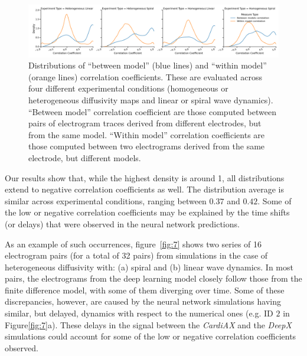 \documentclass[utf8]{frontiersSCNS} %
\begin{document}
\begin{figure}[!htp]
\centering
\includegraphics[width=\textwidth]{Figure-6.png}
\caption{ 
Distributions of ``between model'' (blue lines) and ``within model'' (orange lines) correlation coefficients. These are evaluated across four different experimental conditions (homogeneous or heterogeneous diffusivity maps and linear or spiral wave dynamics). ``Between model'' correlation coefficient are those computed between pairs of electrogram traces derived from different electrodes, but from the same model. ``Within model'' correlation coefficients are those computed between two electrograms derived from the same electrode, but different models.
}
\label{fig:6}
\end{figure}

Our results show that, while the highest density is around 1, all distributions extend to negative correlation coefficients as well. The distribution average is similar across experimental conditions, ranging between $0.37$ and $0.42$. 
Some of the low or negative correlation coefficients may be explained by the time shifts (or delays) that were observed in the neural network predictions. 

As an example of such occurrences, figure~\ref{fig:7} shows two series of 16 electrogram pairs (for a total of 32 pairs) from simulations in the case of heterogeneous diffusivity with: (a) spiral and (b) linear wave dynamics.
In most pairs, the electrograms from the deep learning model closely follow those from the finite difference model, with some of them diverging over time. 
Some of these discrepancies, however, are caused by the neural network simulations having similar, but delayed, dynamics with respect to the numerical ones (e.g. ID $2$ in Figure\ref{fig:7}a).
These delays in the signal between the \textit{CardiAX} and the \textit{DeepX} simulations could account for some of the low or negative correlation coefficients observed.
\end{document}
